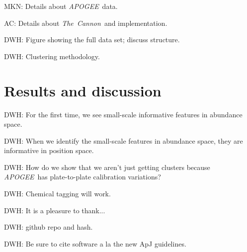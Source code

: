 \documentclass[12pt, letterpaper, preprint]{aastex}
\newcommand{\acronym}[1]{{\small{#1}}}
\newcommand{\project}[1]{\textsl{#1}}
\newcommand{\apogee}{\acronym{\project{APOGEE}}}
\newcommand{\thecannon}{\project{The~Cannon}}
\begin{document}
MKN: Details about \apogee\ data.

AC: Details about \thecannon\ and implementation.

DWH: Figure showing the full data set; discuss structure.

DWH: Clustering methodology.

\section{Results and discussion}

DWH: For the first time, we see small-scale informative features in abundance space.

DWH: When we identify the small-scale features in abundance space, they are informative in position space.

DWH: How do we show that we aren't just getting clusters because \apogee\ has plate-to-plate calibration variations?

DWH: Chemical tagging will work.

\acknowledgements
DWH: It is a pleasure to thank...

DWH: github repo and hash.

DWH: Be sure to cite software a la the new ApJ guidelines.
\end{document}
